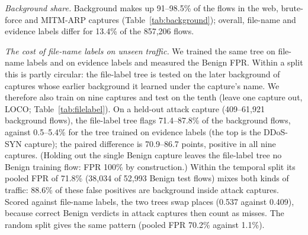 \emph{Background share.} Background makes up 91--98.5\% of the flows in the web, brute-force and MITM-ARP captures (Table~\ref{tab:background}); overall, file-name and evidence labels differ for 13.4\% of the 857,206 flows.

\emph{The cost of file-name labels on unseen traffic.} We trained the same tree on file-name labels and on evidence labels and measured the Benign FPR. Within a split this is partly circular: the file-label tree is tested on the later background of captures whose earlier background it learned under the capture's name. We therefore also train on nine captures and test on the tenth (leave one capture out, LOCO; Table~\ref{tab:filelabel}). On a held-out attack capture (409--61,921 background flows), the file-label tree flags 71.4--87.8\% of the background flows, against 0.5--5.4\% for the tree trained on evidence labels (the top is the DDoS-SYN capture); the paired difference is 70.9--86.7 points, positive in all nine captures. (Holding out the single Benign capture leaves the file-label tree no Benign training flow: FPR 100\% by construction.) Within the temporal split its pooled FPR of 71.8\% (38,034 of 52,993 Benign test flows) mixes both kinds of traffic: 88.6\% of these false positives are background inside attack captures. Scored against file-name labels, the two trees swap places (0.537 against 0.409), because correct Benign verdicts in attack captures then count as misses. The random split gives the same pattern (pooled FPR 70.2\% against 1.1\%).

